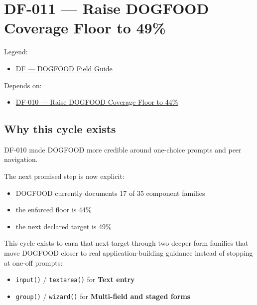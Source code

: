 \chapter{DF-011 --- Raise DOGFOOD Coverage Floor to 49\%}\label{record-073}

\smallskip

Legend:

\begin{itemize}
\tightlist
\item
  \href{https://github.com/flyingrobots/bijou/blob/1853ad902f6bf219326409e7f743a5a1d6517dbc/docs/legends/DF-dogfood-field-guide.md}{DF --- DOGFOOD Field Guide}
\end{itemize}

Depends on:

\begin{itemize}
\tightlist
\item
  \href{https://github.com/flyingrobots/bijou/blob/cbd70612140e7a450d764b3c7be1c6af878b99bc/docs/design/DF-010-raise-dogfood-coverage-floor-to-44-percent.md}{DF-010 --- Raise DOGFOOD Coverage Floor to 44\%}
\end{itemize}

\section{Why this cycle exists}\label{record-073-why-this-cycle-exists}

DF-010 made DOGFOOD more credible around one-choice prompts and peer navigation.

The next promised step is now explicit:

\begin{itemize}
\tightlist
\item
  DOGFOOD currently documents 17 of 35 component families
\item
  the enforced floor is 44\%
\item
  the next declared target is 49\%
\end{itemize}

This cycle exists to earn that next target through two deeper form families that move DOGFOOD closer to real application-building guidance instead of stopping at one-off prompts:

\begin{itemize}
\tightlist
\item
  \texttt{i\allowbreak{}n\allowbreak{}p\allowbreak{}u\allowbreak{}t\allowbreak{}(\allowbreak{})} / \texttt{t\allowbreak{}e\allowbreak{}x\allowbreak{}t\allowbreak{}a\allowbreak{}r\allowbreak{}e\allowbreak{}a\allowbreak{}(\allowbreak{})} for \textbf{Text entry}
\item
  \texttt{g\allowbreak{}r\allowbreak{}o\allowbreak{}u\allowbreak{}p\allowbreak{}(\allowbreak{})} / \texttt{w\allowbreak{}i\allowbreak{}z\allowbreak{}a\allowbreak{}r\allowbreak{}d\allowbreak{}(\allowbreak{})} for \textbf{Multi-field and staged forms}
\end{itemize}

